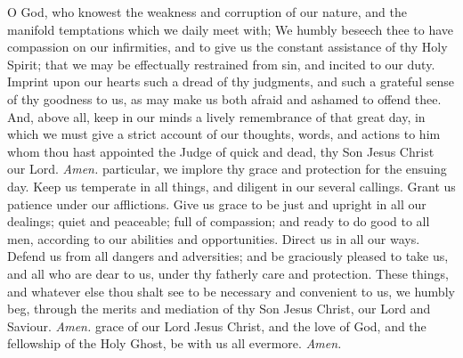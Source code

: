  O God, who knowest the weakness and corruption of our nature, and the manifold temptations which we daily meet with; We humbly beseech thee to have compassion on our infirmities, and to give us the constant assistance of thy Holy Spirit; that we may be effectually restrained from sin, and incited to our duty. Imprint upon our hearts such a dread of thy judgments, and such a grateful sense of thy goodness to us, as may make us both afraid and ashamed to offend thee. And, above all, keep in our minds a lively remembrance of that great day, in which we must give a strict account of our thoughts, words, and actions to him whom thou hast appointed the Judge of quick and dead, thy Son Jesus Christ our Lord. \textit{Amen.}
 particular, we implore thy grace and protection for the ensuing day. Keep us temperate in all things, and diligent in our several callings. Grant us patience under our afflictions. Give us grace to be just and upright in all our dealings; quiet and peaceable; full of compassion; and ready to do good to all men, according to our abilities and opportunities. Direct us in all our ways. Defend us from all dangers and adversities; and be graciously pleased to take us, and all who are dear to us, under thy fatherly care and protection. These things, and whatever else thou shalt see to be necessary and convenient to us, we humbly beg, through the merits and mediation of thy Son Jesus Christ, our Lord and Saviour. \textit{Amen.}
 grace of our Lord Jesus Christ, {} and the love of God, and the fellowship of the Holy Ghost, be with us all evermore. \textit{Amen.}

